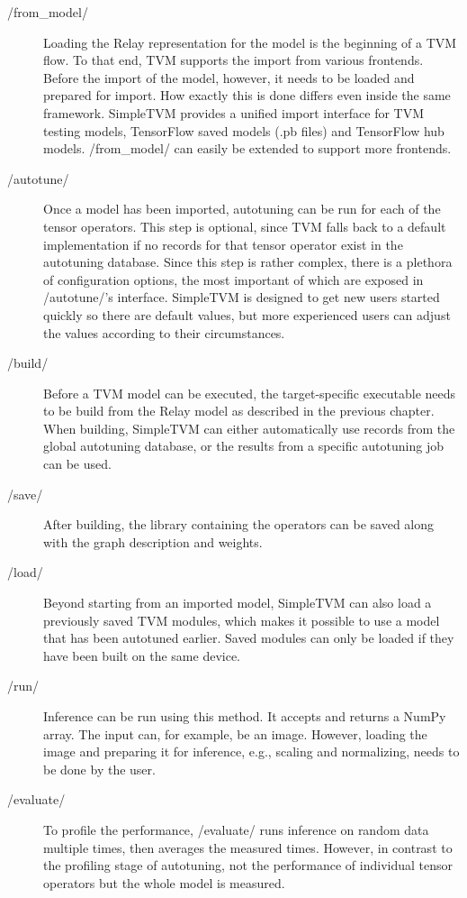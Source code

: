 \begin{description}
	\item[\pythoninline/from_model/] Loading the Relay representation for the model is the beginning of a TVM flow. To that end, TVM supports the import from various frontends. Before the import of the model, however, it needs to be loaded and prepared for import. How exactly this is done differs even inside the same framework. SimpleTVM provides a unified import interface for TVM testing models, TensorFlow saved models (.pb files) and TensorFlow hub models. \pythoninline/from_model/ can easily be extended to support more frontends.
	\item[\pythoninline/autotune/] Once a model has been imported, autotuning can be run for each of the tensor operators. This step is optional, since TVM falls back to a default implementation if no records for that tensor operator exist in the autotuning database. Since this step is rather complex, there is a plethora of configuration options, the most important of which are exposed in \pythoninline/autotune/'s interface. SimpleTVM is designed to get new users started quickly so there are default values, but more experienced users can adjust the values according to their circumstances.
	\item[\pythoninline/build/] Before a TVM model can be executed, the target-specific executable needs to be build from the Relay model as described in the previous chapter. When building, SimpleTVM can either automatically use records from the global autotuning database, or the results from a specific autotuning job can be used.
	\item[\pythoninline/save/] After building, the library containing the operators can be saved along with the graph description and weights.
	\item[\pythoninline/load/] Beyond starting from an imported model, SimpleTVM can also load a previously saved TVM modules, which makes it possible to use a model that has been autotuned earlier. Saved modules can only be loaded if they have been built on the same device.
	\item[\pythoninline/run/] Inference can be run using this method. It accepts and returns a NumPy array. The input can, for example, be an image. However, loading the image and preparing it for inference, e.g., scaling and normalizing, needs to be done by the user.
	\item[\pythoninline/evaluate/] To profile the performance, \pythoninline/evaluate/ runs inference on random data multiple times, then averages the measured times. However, in contrast to the profiling stage of autotuning, not the performance of individual tensor operators but the whole model is measured.
\end{description}

